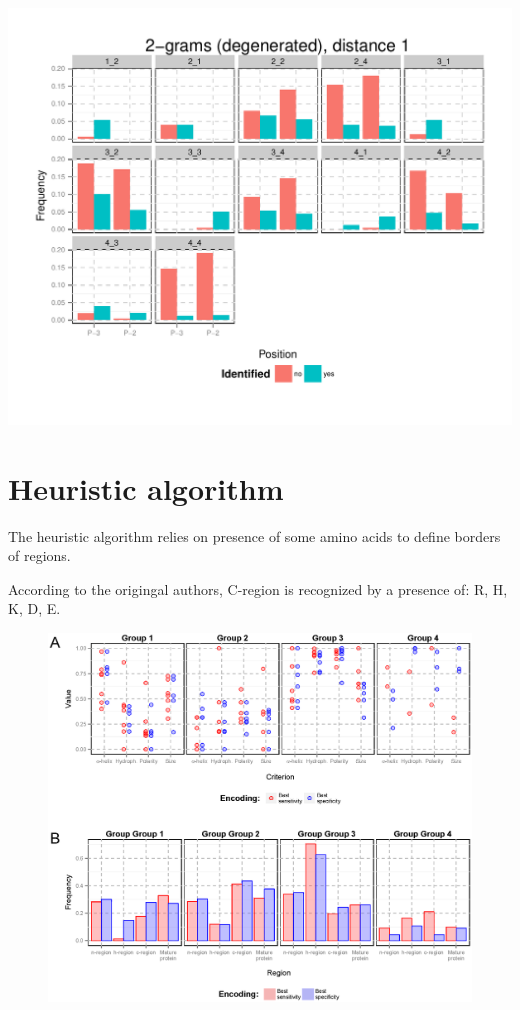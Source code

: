 \documentclass[10pt]{beamer}\usepackage[]{graphicx}\usepackage[]{color}
\makeatletter
\def\maxwidth{ %
  \ifdim\Gin@nat@width>\linewidth
    \linewidth
  \else
    \Gin@nat@width
  \fi
}
\makeatother
\begin{document}
\begin{frame}

\includegraphics[width=\maxwidth]{figure/unnamed-chunk-9-1} 

\end{frame}

\section{Heuristic algorithm}

\begin{frame}
The heuristic algorithm relies on presence of some amino acids to define borders of regions.

According to the origingal authors, C-region is recognized by a presence of: R, H, K, D, E.
\end{frame}

\begin{frame}
\begin{figure}[ht]\centering
\includegraphics[scale=0.42]{enccomp}
\end{figure}
\end{frame}
\end{document}
